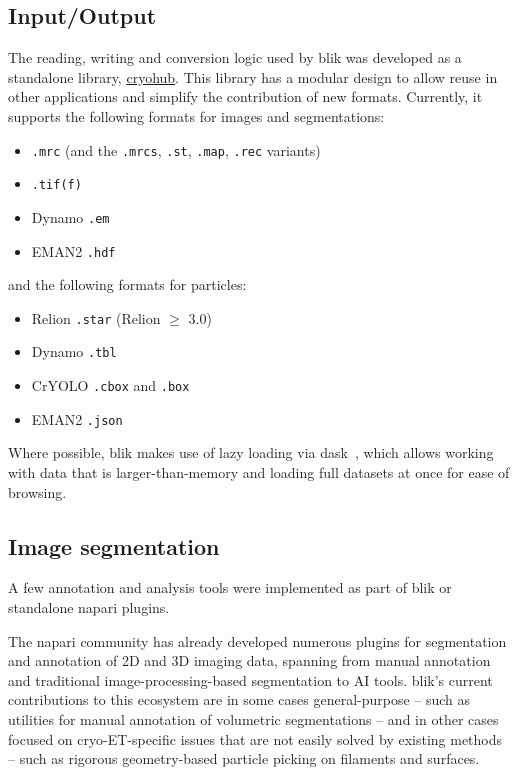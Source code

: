 \subsection{Input/Output}\label{input-output}

The reading, writing and conversion logic used by blik was developed as a standalone library, \href{https://github.com/teamtomo/cryohub/}{cryohub}. This library has a modular design to allow reuse in other applications and simplify the contribution of new formats. Currently, it supports the following formats for images and segmentations:

\begin{itemize}[noitemsep]
    \item \texttt{.mrc} (and the \texttt{.mrcs}, \texttt{.st}, \texttt{.map}, \texttt{.rec} variants) 
    \item \texttt{.tif(f)} 
    \item Dynamo \texttt{.em} 
    \item EMAN2 \texttt{.hdf}
\end{itemize}  

\noindent and the following formats for particles:

\begin{itemize}[noitemsep]
    \item Relion \texttt{.star} (Relion $\geq$ 3.0)
    \item Dynamo \texttt{.tbl} 
    \item CrYOLO \texttt{.cbox} and \texttt{.box}
    \item EMAN2 \texttt{.json}
\end{itemize}

Where possible, blik makes use of lazy loading via dask~\cite{daskdevelopmentteamDaskLibraryDynamic2016}, which allows working with data that is larger-than-memory and loading full datasets at once for ease of browsing.

\subsection{Image segmentation}\label{image-segmentation}

A few annotation and analysis tools were implemented as part of blik or standalone napari plugins.

The napari community has already developed numerous plugins for segmentation and annotation of 2D and 3D imaging data, spanning from manual annotation and traditional image-processing-based segmentation to AI tools. blik's current contributions to this ecosystem are in some cases general-purpose -- such as utilities for manual annotation of volumetric segmentations -- and in other cases focused on cryo-ET-specific issues that are not easily solved by existing methods -- such as rigorous geometry-based particle picking on filaments and surfaces.

